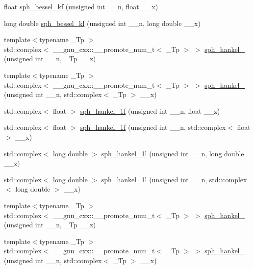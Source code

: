 \begin{DoxyCompactItemize}
\item 
float \hyperlink{namespace____gnu__cxx_af886e8f8dfd2af0c4a9c5929d193d12f}{sph\+\_\+bessel\+\_\+kf} (unsigned int \+\_\+\+\_\+n, float \+\_\+\+\_\+x)
\item 
long double \hyperlink{namespace____gnu__cxx_a22f6a73e50e7020a7c2fa64ce1b9be41}{sph\+\_\+bessel\+\_\+kl} (unsigned int \+\_\+\+\_\+n, long double \+\_\+\+\_\+x)
\item 
{\footnotesize template$<$typename \+\_\+\+Tp $>$ }\\std\+::complex$<$ \+\_\+\+\_\+gnu\+\_\+cxx\+::\+\_\+\+\_\+promote\+\_\+num\+\_\+t$<$ \+\_\+\+Tp $>$ $>$ \hyperlink{namespace____gnu__cxx_a9440f3f92ebc56bd77d64853390247f6}{sph\+\_\+hankel\+\_} (unsigned int \+\_\+\+\_\+n, \+\_\+\+Tp \+\_\+\+\_\+z)
\item 
{\footnotesize template$<$typename \+\_\+\+Tp $>$ }\\std\+::complex$<$ \+\_\+\+\_\+gnu\+\_\+cxx\+::\+\_\+\+\_\+promote\+\_\+num\+\_\+t$<$ \+\_\+\+Tp $>$ $>$ \hyperlink{namespace____gnu__cxx_a0bf6e485b5ec9d1ae4ab604137216d70}{sph\+\_\+hankel\+\_} (unsigned int \+\_\+\+\_\+n, std\+::complex$<$ \+\_\+\+Tp $>$ \+\_\+\+\_\+x)
\item 
std\+::complex$<$ float $>$ \hyperlink{namespace____gnu__cxx_a70d4fc01069f3f0ac0e3b52fe1dffea4}{sph\+\_\+hankel\+\_\+1f} (unsigned int \+\_\+\+\_\+n, float \+\_\+\+\_\+z)
\item 
std\+::complex$<$ float $>$ \hyperlink{namespace____gnu__cxx_adbb875cd50abb62ac75386143486bb2c}{sph\+\_\+hankel\+\_\+1f} (unsigned int \+\_\+\+\_\+n, std\+::complex$<$ float $>$ \+\_\+\+\_\+x)
\item 
std\+::complex$<$ long double $>$ \hyperlink{namespace____gnu__cxx_a6e77fd5cddfbd57d9120b20fc6c30e6f}{sph\+\_\+hankel\+\_\+1l} (unsigned int \+\_\+\+\_\+n, long double \+\_\+\+\_\+z)
\item 
std\+::complex$<$ long double $>$ \hyperlink{namespace____gnu__cxx_a3e9d889d8f2e4792e892b12b1f5948b9}{sph\+\_\+hankel\+\_\+1l} (unsigned int \+\_\+\+\_\+n, std\+::complex$<$ long double $>$ \+\_\+\+\_\+x)
\item 
{\footnotesize template$<$typename \+\_\+\+Tp $>$ }\\std\+::complex$<$ \+\_\+\+\_\+gnu\+\_\+cxx\+::\+\_\+\+\_\+promote\+\_\+num\+\_\+t$<$ \+\_\+\+Tp $>$ $>$ \hyperlink{namespace____gnu__cxx_a4f112ebd12bfbea7f0eea9275a1209ac}{sph\+\_\+hankel\+\_} (unsigned int \+\_\+\+\_\+n, \+\_\+\+Tp \+\_\+\+\_\+z)
\item 
{\footnotesize template$<$typename \+\_\+\+Tp $>$ }\\std\+::complex$<$ \+\_\+\+\_\+gnu\+\_\+cxx\+::\+\_\+\+\_\+promote\+\_\+num\+\_\+t$<$ \+\_\+\+Tp $>$ $>$ \hyperlink{namespace____gnu__cxx_a54a1b7896a7218bfe0fb7f422af62122}{sph\+\_\+hankel\+\_} (unsigned int \+\_\+\+\_\+n, std\+::complex$<$ \+\_\+\+Tp $>$ \+\_\+\+\_\+x)

\end{DoxyCompactItemize}
